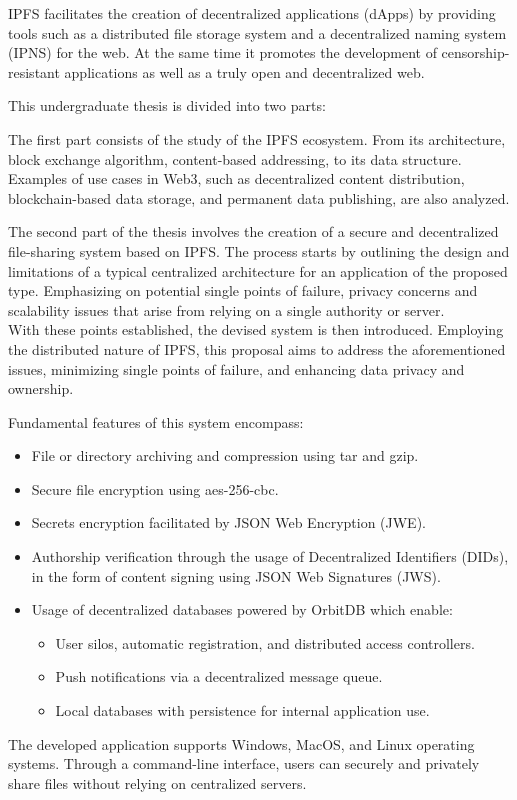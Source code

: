 IPFS facilitates the creation of decentralized applications (dApps) by providing tools such as a distributed file storage system and a decentralized naming system (IPNS) for the web. At the same time it promotes the development of censorship-resistant applications as well as a truly open and decentralized web.

This undergraduate thesis is divided into two parts:

The first part consists of the study of the IPFS ecosystem. From its architecture, block exchange algorithm, content-based addressing, to its data structure. Examples of use cases in Web3, such as decentralized content distribution, blockchain-based data storage, and permanent data publishing, are also analyzed.

The second part of the thesis involves the creation of a secure and decentralized file-sharing system based on IPFS.
The process starts by outlining the design and limitations of a typical centralized architecture for an application of the proposed type. Emphasizing on potential single points of failure, privacy concerns and scalability issues that arise from relying on a single authority or server.
\\With these points established, the devised system is then introduced. Employing the distributed nature of IPFS, this proposal aims to address the aforementioned issues, minimizing single points of failure, and enhancing data privacy and ownership.

Fundamental features of this system encompass:

\begin{itemize}[itemsep=1pt,nolistsep]
    \item File or directory archiving and compression using tar and gzip.
    \item Secure file encryption using aes-256-cbc.
    \item Secrets encryption facilitated by JSON Web Encryption (JWE).
    \item Authorship verification through the usage of Decentralized Identifiers (DIDs), in the form of content signing using JSON Web Signatures (JWS).
    \item Usage of decentralized databases powered by OrbitDB which enable:
          \begin{itemize}
              \item User silos, automatic registration, and distributed access controllers.
              \item Push notifications via a decentralized message queue.
              \item Local databases with persistence for internal application use.
          \end{itemize}
\end{itemize}


The developed application supports Windows, MacOS, and Linux operating systems. Through a command-line interface, users can securely and privately share files without relying on centralized servers.